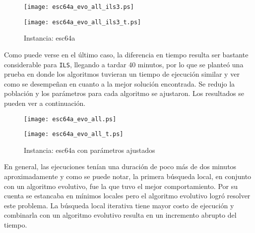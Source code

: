 \begin{figure}
    \centering
    \begin{minipage}{0.5\textwidth}
        \centering
        \texttt{[image: esc64a\_evo\_all\_ils3.ps]} %
    \end{minipage}\hfill
    \begin{minipage}{0.5\textwidth}
        \centering
        \texttt{[image: esc64a\_evo\_all\_ils3\_t.ps]} %
    \end{minipage}
    \caption*{Instancia: esc64a\cite{esc64a}}
\end{figure}

\newpage

Como puede verse en el último caso, la diferencia en tiempo resulta ser bastante considerable para \texttt{ILS}, llegando a tardar 40 minutos, por lo que se planteó una prueba en donde los algoritmos tuvieran un tiempo de ejecución similar y ver como se desempeñan en cuanto a la mejor solución encontrada. Se redujo la población y los parámetros para cada algoritmo se ajustaron. Los resultados se pueden ver a continuación.

\begin{figure}[h]
    \centering
    \begin{minipage}{0.5\textwidth}
        \centering
        \texttt{[image: esc64a\_evo\_all.ps]} %
    \end{minipage}\hfill
    \begin{minipage}{0.5\textwidth}
        \centering
        \texttt{[image: esc64a\_evo\_all\_t.ps]} %
    \end{minipage}
    \caption*{Instancia: esc64a\cite{esc64a} con parámetros ajustados}
\end{figure}

En general, las ejecuciones tenían una duración de poco más de dos minutos aproximadamente y como se puede notar, la primera búsqueda local, en conjunto con un algoritmo evolutivo, fue la que tuvo el mejor comportamiento. Por su cuenta se estancaba en mínimos locales pero el algoritmo evolutivo logró resolver este problema. La búsqueda local iterativa tiene mayor costo de ejecución y combinarla con un algoritmo evolutivo resulta en un incremento abrupto del tiempo.

